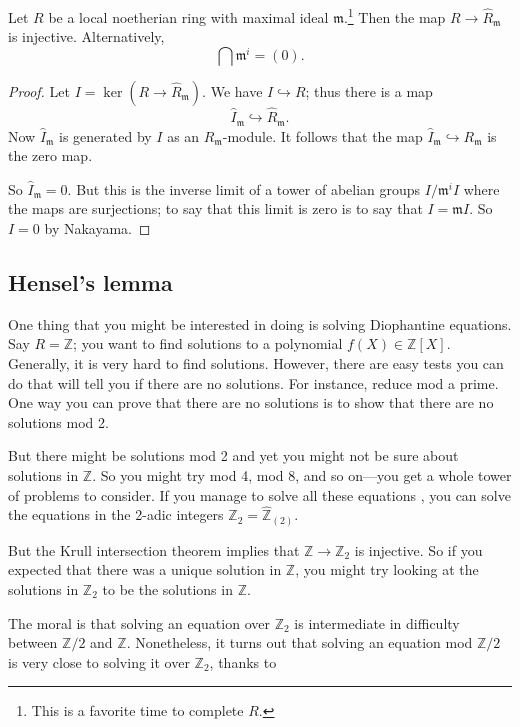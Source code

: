 \begin{theorem}[Krull] Let $R$ be a local noetherian ring with maximal ideal
$\mathfrak{m}$.\footnote{This is a favorite time to complete $R$.} Then the map
$R \to \hat{R}_{\mathfrak{m}}$ is injective. Alternatively,
\[ \bigcap \mathfrak{m}^i = (0).  \]
\end{theorem} 

\begin{proof} 
Let $I = \ker(R \to \hat{R}_{\mathfrak{m}})$. We have $I \hookrightarrow R$;
thus there is a map
\[ \hat{I}_{\mathfrak{m}}  \hookrightarrow \hat{R}_{\mathfrak{m}}. \]
Now $\hat{I}_{\mathfrak{m}}$ is generated by $I$ as an
$R_{\mathfrak{m}}$-module. It follows that the map $\hat{I}_{\mathfrak{m}}
\hookrightarrow R_{\mathfrak{m}}$ is the zero map. 

So $\hat{I}_{\mathfrak{m}} = 0$. But this is the inverse limit of  a tower of
abelian groups $I/\mathfrak{m}^i I $ where the maps are surjections; to say
that this limit is zero is to say that $I = \mathfrak{m}I$. So $I = 0$ by
Nakayama. 
\end{proof} 

\subsection{Hensel's lemma} One thing that you might be interested in doing is solving
Diophantine equations. Say $R = \mathbb{Z}$; you want to find solutions to a
polynomial $f(X) \in \mathbb{Z}[X]$. Generally, it is very hard to find
solutions. However, there are easy tests you can do that will tell you if there
are no solutions. For instance, reduce mod a prime. One way you can prove that
there are no solutions is to show that there are no solutions mod 2. 

But there might be solutions mod 2 and yet you might not be sure about
solutions in $\mathbb{Z}$. So you might try mod 4, mod 8, and so on---you get a
whole tower of problems to consider. If you manage to solve all these equations
, you can solve the equations in the 2-adic integers $\mathbb{Z}_2 =
\hat{\mathbb{Z}}_{(2)}$.

But the Krull intersection theorem implies that $\mathbb{Z} \to \mathbb{Z}_2$
is injective. So if you expected that there was a unique solution in
$\mathbb{Z}$, you might try looking at the solutions in $\mathbb{Z}_2$ to be
the solutions in $\mathbb{Z}$.



The moral is that solving an equation over $\mathbb{Z}_2$ is intermediate in
difficulty between $\mathbb{Z}/2$ and $\mathbb{Z}$. Nonetheless, it turns out
that solving an equation mod $\mathbb{Z}/2$ is very close to solving it over
$\mathbb{Z}_2$, thanks to

